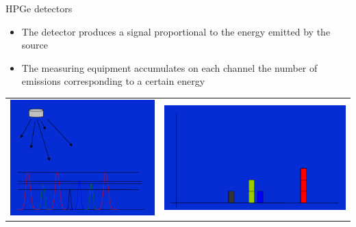 \begin{frame}{HPGe detectors}



\begin{itemize}
\item The detector produces a signal proportional to the energy emitted by the source
\item The measuring equipment accumulates on each channel the number of emissions corresponding to a certain energy
\end{itemize}



\pause
\begin{table}
\begin{tabular}{cc}
\includegraphics[scale=0.2]{figures/schemedetection1.png} & \includegraphics[scale=0.2]{figures/detectionsystem2.png}
\end{tabular}
\end{table}

\end{frame}

